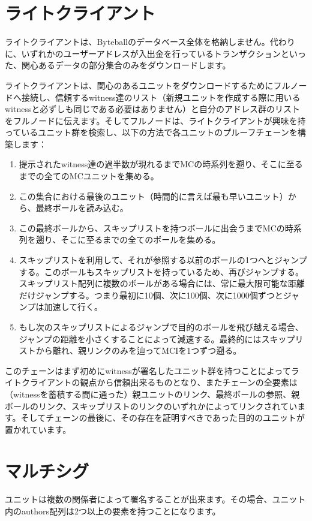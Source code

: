 \documentclass[a4paper, dvipdfmx]{jsarticle}
\begin{document}
\section{ライトクライアント}
ライトクライアントは、Byteballのデータベース全体を格納しません。代わりに、いずれかのユーザーアドレスが入出金を行っているトランザクションといった、関心あるデータの部分集合のみをダウンロードします。

ライトクライアントは、関心のあるユニットをダウンロードするためにフルノードへ接続し、信頼するwitness達のリスト（新規ユニットを作成する際に用いるwitnessと必ずしも同じである必要はありません）と自分のアドレス群のリストをフルノードに伝えます。そしてフルノードは、ライトクライアントが興味を持っているユニット群を検索し、以下の方法で各ユニットのプルーフチェーンを構築します：
\begin{enumerate}
    \item 提示されたwitness達の過半数が現れるまでMCの時系列を遡り、そこに至るまでの全てのMCユニットを集める。
    \item この集合における最後のユニット（時間的に言えば最も早いユニット）から、最終ボールを読み込む。
    \item この最終ボールから、スキップリストを持つボールに出会うまでMCの時系列を遡り、そこに至るまでの全てのボールを集める。
    \item スキップリストを利用して、それが参照する以前のボールの1つへとジャンプする。このボールもスキップリストを持っているため、再びジャンプする。スキップリスト配列に複数のボールがある場合には、常に最大限可能な距離だけジャンプする。つまり最初に10個、次に100個、次に1000個ずつとジャンプは加速して行く。
    \item もし次のスキップリストによるジャンプで目的のボールを飛び越える場合、ジャンプの距離を小さくすることによって減速する。最終的にはスキップリストから離れ、親リンクのみを辿ってMCIを1つずつ遡る。
\end{enumerate}

\noindent このチェーンはまず初めにwitnessが署名したユニット群を持つことによってライトクライアントの観点から信頼出来るものとなり、またチェーンの全要素は（witnessを蓄積する間に通った）親ユニットのリンク、最終ボールの参照、親ボールのリンク、スキップリストのリンクのいずれかによってリンクされています。そしてチェーンの最後に、その存在を証明すべきであった目的のユニットが置かれています。

\section{マルチシグ}
ユニットは複数の関係者によって署名することが出来ます。その場合、ユニット内のauthors配列は2つ以上の要素を持つことになります。
\end{document}

